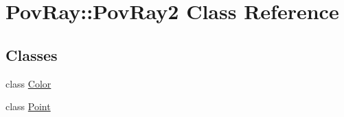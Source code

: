 \hypertarget{class_pov_ray_1_1_pov_ray2}{}\section{Pov\+Ray\+:\+:Pov\+Ray2 Class Reference}
\label{class_pov_ray_1_1_pov_ray2}
\subsection*{Classes}
\begin{DoxyCompactItemize}
\item 
class \mbox{\hyperlink{class_pov_ray_1_1_pov_ray2_1_1_color}{Color}}
\item 
class \mbox{\hyperlink{class_pov_ray_1_1_pov_ray2_1_1_point}{Point}}
\end{DoxyCompactItemize}
